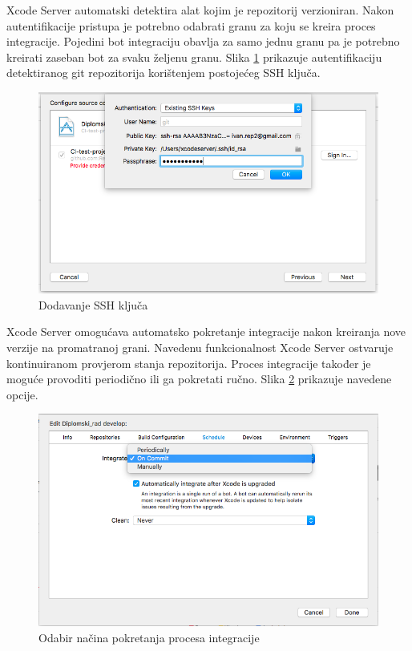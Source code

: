 \documentclass[times, utf8, diplomski, numeric]{fer}
\begin{document}
Xcode Server automatski detektira alat kojim je repozitorij verzioniran. Nakon autentifikacije pristupa je potrebno odabrati granu za koju se kreira proces integracije. Pojedini bot integraciju obavlja za samo jednu granu pa je potrebno kreirati zaseban bot za svaku željenu granu. Slika \ref{fig:BotAddingSSH} prikazuje autentifikaciju detektiranog git repozitorija korištenjem postojećeg SSH ključa.

\begin{figure}
\centering
\includegraphics[scale=0.5]{BotAddingSSH}
\caption{Dodavanje SSH ključa}
\label{fig:BotAddingSSH}
\end{figure}

Xcode Server omogućava automatsko pokretanje integracije nakon kreiranja nove verzije na promatranoj grani. Navedenu funkcionalnost Xcode Server ostvaruje kontinuiranom provjerom stanja repozitorija. Proces integracije također je moguće provoditi periodično ili ga pokretati ručno. Slika \ref{fig:CIStartConfig} prikazuje navedene opcije.

\begin{figure}[b!]
\centering
\includegraphics[scale=0.5]{CIStartConfig}
\caption{Odabir načina pokretanja procesa integracije}
\label{fig:CIStartConfig}
\end{figure}
\end{document}
